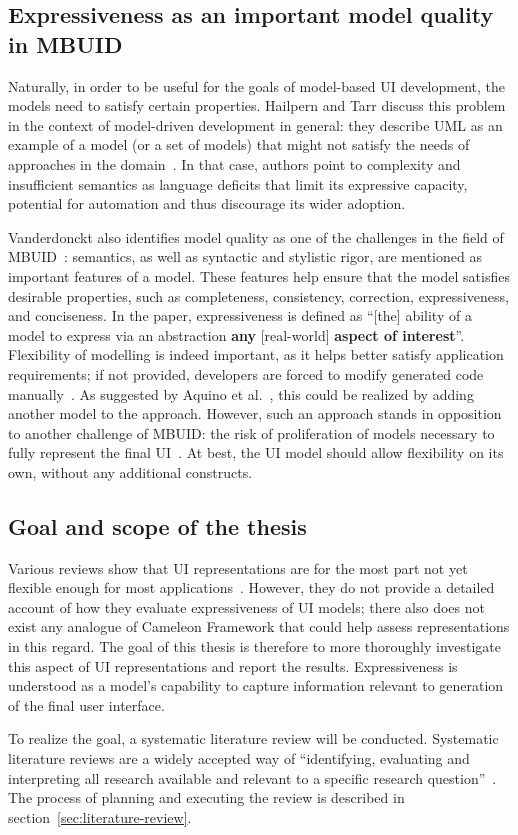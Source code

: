 \subsection{Expressiveness as an important model quality in MBUID}\label{subsec:model-quality-in-mbuid}
Naturally, in order to be useful for the goals of model-based UI development, the models need to satisfy certain properties.
Hailpern and Tarr discuss this problem in the context of model-driven development in general: they describe UML as an example of a model (or a set of models) that might not satisfy the needs of approaches in the domain~\cite{Hailpern2006}.
In that case, authors point to complexity and insufficient semantics as language deficits that limit its expressive capacity, potential for automation and thus discourage its wider adoption.

Vanderdonckt also identifies model quality as one of the challenges in the field of MBUID~\cite{Vanderdonckt2008}: semantics, as well as syntactic and stylistic rigor, are mentioned as important features of a model.
These features help ensure that the model satisfies desirable properties, such as completeness, consistency, correction, expressiveness, and conciseness.
In the paper, expressiveness is defined as \enquote{[the] ability of a model to express via an abstraction \textbf{any} [real-world] \textbf{aspect of interest}}.
Flexibility of modelling is indeed important, as it helps better satisfy application requirements;
if not provided, developers are forced to modify generated code manually~\cite{Pederiva2007}.
As suggested by Aquino et al.~\cite{Aquino2010}, this could be realized by adding another model to the approach.
However, such an approach stands in opposition to another challenge of MBUID: the risk of proliferation of models necessary to fully represent the final UI~\cite{Vanderdonckt2008}.
At best, the UI model should allow flexibility on its own, without any additional constructs.

\subsection{Goal and scope of the thesis}\label{subsec:goal-and-scope}

Various reviews show that UI representations are for the most part not yet flexible enough for most applications~\cite{Ruiz2018, Souchon2003}.
However, they do not provide a detailed account of how they evaluate expressiveness of UI models;
there also does not exist any analogue of Cameleon Framework that could help assess representations in this regard.
The goal of this thesis is therefore to more thoroughly investigate this aspect of UI representations and report the results.
Expressiveness is understood as a model's capability to capture information relevant to generation of the final user interface.

To realize the goal, a systematic literature review will be conducted.
Systematic literature reviews are a widely accepted way of \enquote{identifying, evaluating and interpreting all research available and relevant to a specific research question}~\cite{kitchenham_guidelines_2007}.
The process of planning and executing the review is described in section~\ref{sec:literature-review}.
